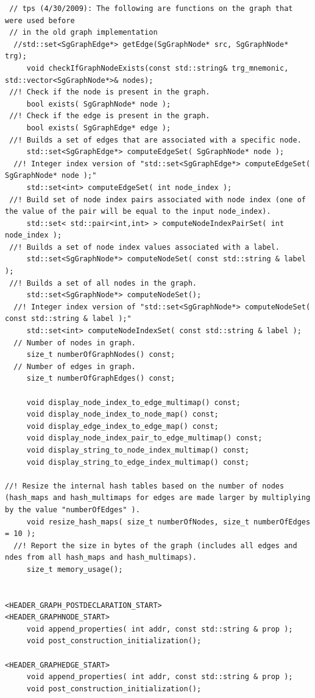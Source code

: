 \begin{enumerate}
\begin{lstlisting}
 // tps (4/30/2009): The following are functions on the graph that were used before 
 // in the old graph implementation
  //std::set<SgGraphEdge*> getEdge(SgGraphNode* src, SgGraphNode* trg);
     void checkIfGraphNodeExists(const std::string& trg_mnemonic, std::vector<SgGraphNode*>& nodes);
 //! Check if the node is present in the graph.
     bool exists( SgGraphNode* node );
 //! Check if the edge is present in the graph.
     bool exists( SgGraphEdge* edge );
 //! Builds a set of edges that are associated with a specific node.
     std::set<SgGraphEdge*> computeEdgeSet( SgGraphNode* node );
  //! Integer index version of "std::set<SgGraphEdge*> computeEdgeSet( SgGraphNode* node );"
     std::set<int> computeEdgeSet( int node_index );
 //! Build set of node index pairs associated with node index (one of the value of the pair will be equal to the input node_index).
     std::set< std::pair<int,int> > computeNodeIndexPairSet( int node_index );
 //! Builds a set of node index values associated with a label.
     std::set<SgGraphNode*> computeNodeSet( const std::string & label );
 //! Builds a set of all nodes in the graph.
     std::set<SgGraphNode*> computeNodeSet();
  //! Integer index version of "std::set<SgGraphNode*> computeNodeSet( const std::string & label );"
     std::set<int> computeNodeIndexSet( const std::string & label );
  // Number of nodes in graph.
     size_t numberOfGraphNodes() const;
  // Number of edges in graph.
     size_t numberOfGraphEdges() const;

     void display_node_index_to_edge_multimap() const;
     void display_node_index_to_node_map() const;
     void display_edge_index_to_edge_map() const;
     void display_node_index_pair_to_edge_multimap() const;
     void display_string_to_node_index_multimap() const;
     void display_string_to_edge_index_multimap() const;

//! Resize the internal hash tables based on the number of nodes (hash_maps and hash_multimaps for edges are made larger by multiplying by the value "numberOfEdges" ).
     void resize_hash_maps( size_t numberOfNodes, size_t numberOfEdges = 10 );
  //! Report the size in bytes of the graph (includes all edges and ndes from all hash_maps and hash_multimaps).
     size_t memory_usage();


<HEADER_GRAPH_POSTDECLARATION_START>
<HEADER_GRAPHNODE_START>
     void append_properties( int addr, const std::string & prop );	
     void post_construction_initialization();

<HEADER_GRAPHEDGE_START>
     void append_properties( int addr, const std::string & prop );
     void post_construction_initialization();


\end{lstlisting}
\end{enumerate}
